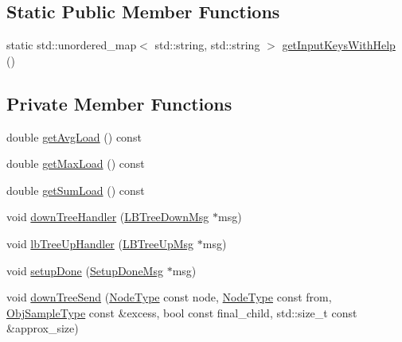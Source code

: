 \subsection*{Static Public Member Functions}
\begin{DoxyCompactItemize}
\item 
static std\+::unordered\+\_\+map$<$ std\+::string, std\+::string $>$ \hyperlink{structvt_1_1vrt_1_1collection_1_1lb_1_1_hierarchical_l_b_a3d0967de5be48bdb9ca86178b6b2a2d1}{get\+Input\+Keys\+With\+Help} ()
\end{DoxyCompactItemize}
\subsection*{Private Member Functions}
\begin{DoxyCompactItemize}
\item 
double \hyperlink{structvt_1_1vrt_1_1collection_1_1lb_1_1_hierarchical_l_b_a2fced8b5bbeeef2c150e66146cc77961}{get\+Avg\+Load} () const
\item 
double \hyperlink{structvt_1_1vrt_1_1collection_1_1lb_1_1_hierarchical_l_b_a32428a4c65c820d846e398270578d986}{get\+Max\+Load} () const
\item 
double \hyperlink{structvt_1_1vrt_1_1collection_1_1lb_1_1_hierarchical_l_b_a4cdebd4215afd2cac890525c7901f4ad}{get\+Sum\+Load} () const
\item 
void \hyperlink{structvt_1_1vrt_1_1collection_1_1lb_1_1_hierarchical_l_b_aa5e027cba0dfc9a1c7bc710e9932647a}{down\+Tree\+Handler} (\hyperlink{structvt_1_1vrt_1_1collection_1_1lb_1_1_l_b_tree_down_msg}{L\+B\+Tree\+Down\+Msg} $\ast$msg)
\item 
void \hyperlink{structvt_1_1vrt_1_1collection_1_1lb_1_1_hierarchical_l_b_a3b67d27c10a6a7532c9c5d1a57ab722a}{lb\+Tree\+Up\+Handler} (\hyperlink{structvt_1_1vrt_1_1collection_1_1lb_1_1_l_b_tree_up_msg}{L\+B\+Tree\+Up\+Msg} $\ast$msg)
\item 
void \hyperlink{structvt_1_1vrt_1_1collection_1_1lb_1_1_hierarchical_l_b_a52d7059862182d11f3fcb9683f7ac4a4}{setup\+Done} (\hyperlink{structvt_1_1vrt_1_1collection_1_1lb_1_1_setup_done_msg}{Setup\+Done\+Msg} $\ast$msg)
\item 
void \hyperlink{structvt_1_1vrt_1_1collection_1_1lb_1_1_hierarchical_l_b_aff832357cbb81dc17578c9f8876b7ecf}{down\+Tree\+Send} (\hyperlink{namespacevt_a866da9d0efc19c0a1ce79e9e492f47e2}{Node\+Type} const node, \hyperlink{namespacevt_a866da9d0efc19c0a1ce79e9e492f47e2}{Node\+Type} const from, \hyperlink{structvt_1_1vrt_1_1collection_1_1lb_1_1_load_sampler_base_l_b_a8d939a849ec0d6371c1c4d441ffb9b94}{Obj\+Sample\+Type} const \&excess, bool const final\+\_\+child, std\+::size\+\_\+t const \&approx\+\_\+size)

\end{DoxyCompactItemize}

